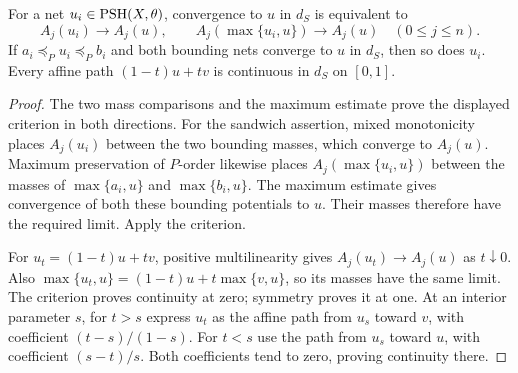 \begin{corollary}\label{cor:singularity-convergence-criteria}
For a net $u_i\in\mathrm{PSH}(X,\theta)$, convergence to $u$ in $d_S$ is equivalent to
\[
 A_j(u_i)\to A_j(u),\qquad A_j(\max\{u_i,u\})\to A_j(u)
                                      \quad(0\leq j\leq n).
\]
If $a_i\preceq_P u_i\preceq_P b_i$ and both bounding nets converge to $u$ in $d_S$, then so does $u_i$. Every affine path $(1-t)u+tv$ is continuous in $d_S$ on $[0,1]$.
\end{corollary}
\begin{proof}
The two mass comparisons and the maximum estimate prove the displayed criterion in both directions. For the sandwich assertion, mixed monotonicity places $A_j(u_i)$ between the two bounding masses, which converge to $A_j(u)$. Maximum preservation of $P$-order likewise places $A_j(\max\{u_i,u\})$ between the masses of $\max\{a_i,u\}$ and $\max\{b_i,u\}$. The maximum estimate gives convergence of both these bounding potentials to $u$. Their masses therefore have the required limit. Apply the criterion.

For $u_t=(1-t)u+tv$, positive multilinearity gives $A_j(u_t)\to A_j(u)$ as $t\downarrow0$. Also
$\max\{u_t,u\}=(1-t)u+t\max\{v,u\}$, so its masses have the same limit. The criterion proves continuity at zero; symmetry proves it at one. At an interior parameter $s$, for $t>s$ express $u_t$ as the affine path from $u_s$ toward $v$, with coefficient $(t-s)/(1-s)$. For $t<s$ use the path from $u_s$ toward $u$, with coefficient $(s-t)/s$. Both coefficients tend to zero, proving continuity there.
\end{proof}

